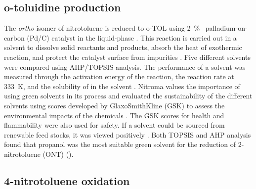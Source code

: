 \subsection{o-toluidine production}

The \textit{ortho} isomer of nitrotoluene is reduced to o-TOL using \SI{2}{\percent\ww} palladium-on-carbon (Pd/C) catalyst in the liquid-phase \cite{rajadhyaksha_solvent_1986}. This reaction is carried out in a solvent to dissolve solid reactants and products, absorb the heat of exothermic reaction, and protect the catalyst surface from impurities \cite{yao_kinetics_1959}. Five different solvents were compared using AHP/TOPSIS analysis. The performance of a solvent was measured through the activation energy of the reaction, the reaction rate at \SI{333}{\K}, and the solubility of  in the solvent \cite{rajadhyaksha_solvent_1986}. Nitroma values the importance of using green solvents in its process and evaluated the sustainability of the different solvents using scores developed by GlaxoSmithKline (GSK) to assess the environmental impacts of the chemicals \cite{henderson_expanding_2011}. The GSK scores for health and flammability were also used for safety. If a solvent could be sourced from renewable feed stocks, it was viewed positively \cite{byrne_tools_2016}. Both TOPSIS and AHP analysis found that propanol was the most suitable green solvent for the reduction of 2-nitrotoluene (ONT) ().


\subsection{4-nitrotoluene oxidation}

